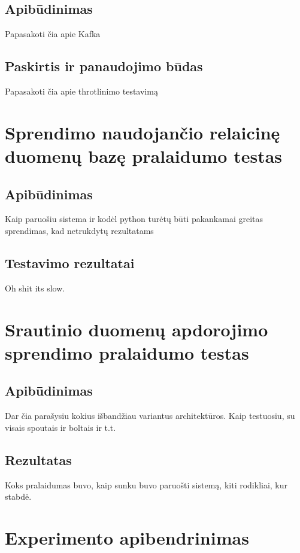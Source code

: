 \documentclass{VUMIFPSkursinis}
\begin{document}
\subsection{Apibūdinimas}

Papasakoti čia apie Kafka

\subsection{Paskirtis ir panaudojimo būdas}

Papasakoti čia apie throtlinimo testavimą

\section{Sprendimo naudojančio relaicinę duomenų bazę pralaidumo testas}

\subsection{Apibūdinimas}

Kaip paruošiu sistema ir kodėl python turėtų būti pakankamai greitas sprendimas, kad netrukdytų rezultatams

\subsection{Testavimo rezultatai}

Oh shit its slow.

\section{Srautinio duomenų apdorojimo sprendimo pralaidumo testas}

\subsection{Apibūdinimas}

Dar čia parašysiu kokius išbandžiau variantus architektūros.
Kaip testuosiu, su visais spoutais ir boltais ir t.t.

\subsection{Rezultatas}

Koks pralaidumas buvo, kaip sunku buvo paruošti sistemą, kiti rodikliai, kur stabdė.

\section{Experimento apibendrinimas}
\end{document}
